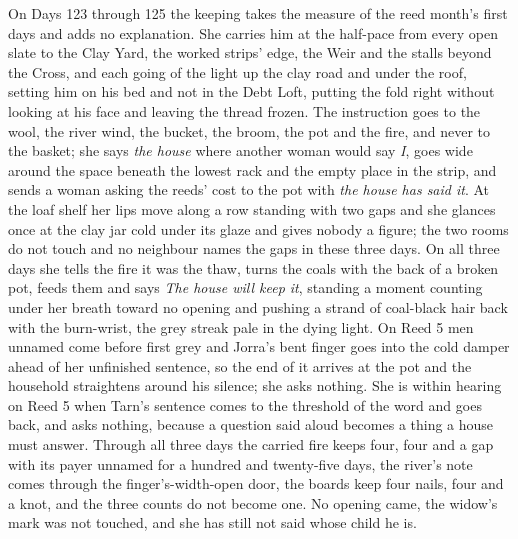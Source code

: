 \documentclass{design/chronicle}
\begin{document}
{On Days 123 through 125 the keeping takes the measure of the reed month’s first days and adds no explanation. She carries him at the half-pace from every open slate to the Clay Yard, the worked strips’ edge, the Weir and the stalls beyond the Cross, and each going of the light up the clay road and under the roof, setting him on his bed and not in the Debt Loft, putting the fold right without looking at his face and leaving the thread frozen. The instruction goes to the wool, the river wind, the bucket, the broom, the pot and the fire, and never to the basket; she says \emph{the house} where another woman would say \emph{I}, goes wide around the space beneath the lowest rack and the empty place in the strip, and sends a woman asking the reeds’ cost to the pot with \emph{the house has said it}. At the loaf shelf her lips move along a row standing with two gaps and she glances once at the clay jar cold under its glaze and gives nobody a figure; the two rooms do not touch and no neighbour names the gaps in these three days. On all three days she tells the fire it was the thaw, turns the coals with the back of a broken pot, feeds them and says \emph{The house will keep it}, standing a moment counting under her breath toward no opening and pushing a strand of coal-black hair back with the burn-wrist, the grey streak pale in the dying light. On Reed 5 men unnamed come before first grey and Jorra’s bent finger goes into the cold damper ahead of her unfinished sentence, so the end of it arrives at the pot and the household straightens around his silence; she asks nothing. She is within hearing on Reed 5 when Tarn’s sentence comes to the threshold of the word and goes back, and asks nothing, because a question said aloud becomes a thing a house must answer. Through all three days the carried fire keeps four, four and a gap with its payer unnamed for a hundred and twenty-five days, the river’s note comes through the finger’s-width-open door, the boards keep four nails, four and a knot, and the three counts do not become one. No opening came, the widow’s mark was not touched, and she has still not said whose child he is.

}
\end{document}
